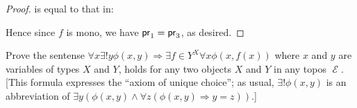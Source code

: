 \documentclass[a4paper]{article}
\DeclareMathOperator{\E}{\mathcal E}
\DeclareMathOperator{\pr}{\sf pr}
\DeclareMathOperator{\ev}{\text {ev}}
\begin{document}
\begin{proof}
    is equal to that in:

    \begin{center}
    \end{center}

    Hence since $f$ is mono, we have $\pr_1=\pr_3$, as desired.
    



\end{proof}
\begin{question}
    Prove the sentense $\forall x\exists !y\phi(x,y)\Rightarrow \exists f\in Y^X\forall x\phi(x,f(x))$ where $x$ and $y$ are variables of types $X$ and $Y$, holds for any two objects $X$ and $Y$ in any topos $\E$. [This formula expresses the ``axiom of unique choice''; as usual, $\exists ! \phi(x,y)$ is an abbreviation of $\exists y(\phi(x,y)\land \forall z (\phi(x,y)\Rightarrow y = z))$.]
\end{question}
\end{document}
